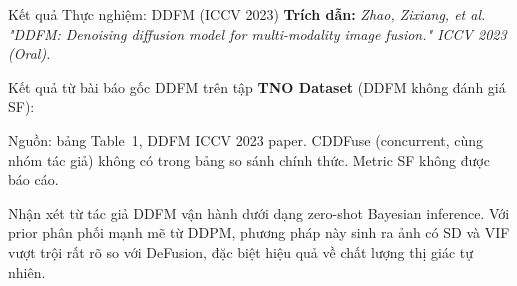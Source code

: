 \documentclass{beamer}
\begin{document}
\begin{frame}{Kết quả Thực nghiệm: DDFM (ICCV 2023)}
    \small
    \textbf{Trích dẫn:} \textit{Zhao, Zixiang, et al. "DDFM: Denoising diffusion model for multi-modality image fusion." ICCV 2023 (Oral).}

    \vspace{0.15cm}
    Kết quả từ bài báo gốc DDFM trên tập \textbf{TNO Dataset} (DDFM không đánh giá SF):
    
    \vspace{0.1cm}
    \begin{table}
        \centering
        \renewcommand{\arraystretch}{1.2}
    \end{table}
    {\tiny Nguồn: bảng Table~1, DDFM ICCV 2023 paper. CDDFuse (concurrent, cùng nhóm tác giả) không có trong bảng so sánh chính thức. Metric SF không được báo cáo.}

    \begin{block}{Nhận xét từ tác giả}
        DDFM vận hành dưới dạng zero-shot Bayesian inference. Với prior phân phối mạnh mẽ từ DDPM, phương pháp này sinh ra ảnh có SD và VIF vượt trội rất rõ so với DeFusion, đặc biệt hiệu quả về chất lượng thị giác tự nhiên.
    \end{block}
\end{frame}
\end{document}
